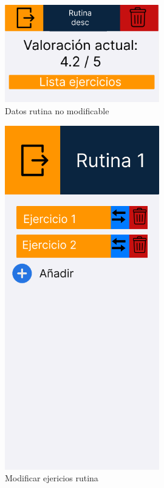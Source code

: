 \begin{figure}[H]
   \centering
    \includegraphics[width=0.6\textwidth]{fotos/Frame 49.png}
    \caption{Datos rutina no modificable}
    \label{fig:Datos rutina no modificable}
\end{figure}
\begin{figure}[H]
   \centering
    \includegraphics[width=0.6\textwidth]{fotos/Frame 50.png}
    \caption{Modificar ejericios rutina}
    \label{fig:Modificar ejericios rutina}
\end{figure}
